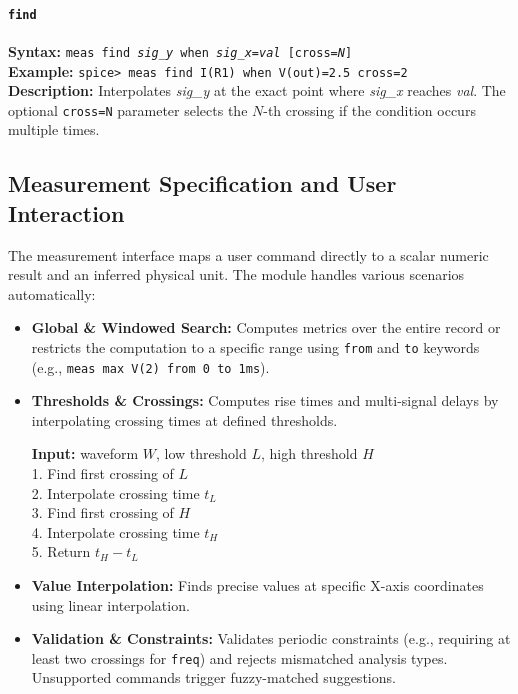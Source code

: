 \paragraph{\texttt{find}}
\textbf{Syntax:} \texttt{meas find \textit{sig\_y} when \textit{sig\_x}=\textit{val} [cross=\textit{N}]}\\
\textbf{Example:} \texttt{spice> meas find I(R1) when V(out)=2.5 cross=2}\\
\textbf{Description:} Interpolates \textit{sig\_y} at the exact point where \textit{sig\_x} reaches \textit{val}. The optional \texttt{cross=N} parameter selects the $N$-th crossing if the condition occurs multiple times.

\subsection{Measurement Specification and User Interaction}
\label{sec:meas-spec}

The measurement interface maps a user command directly to a scalar numeric result and an inferred physical unit. The module handles various scenarios automatically:

\begin{itemize}
  \item \textbf{Global \& Windowed Search:} Computes metrics over the entire record or restricts the computation to a specific range using \texttt{from} and \texttt{to} keywords (e.g., \texttt{meas max V(2) from 0 to 1ms}).
  \item \textbf{Thresholds \& Crossings:} Computes rise times and multi-signal delays by interpolating crossing times at defined thresholds.

  \begin{algorithm}[H]
  \caption{Rise Time Measurement}
  \textbf{Input:} waveform $W$, low threshold $L$, high threshold $H$ \\
  1. Find first crossing of $L$ \\
  2. Interpolate crossing time $t_L$ \\
  3. Find first crossing of $H$ \\
  4. Interpolate crossing time $t_H$ \\
  5. Return $t_H - t_L$
  \end{algorithm}

  \item \textbf{Value Interpolation:} Finds precise values at specific X-axis coordinates using linear interpolation.
  \item \textbf{Validation \& Constraints:} Validates periodic constraints (e.g., requiring at least two crossings for \texttt{freq}) and rejects mismatched analysis types. Unsupported commands trigger fuzzy-matched suggestions.
\end{itemize}



